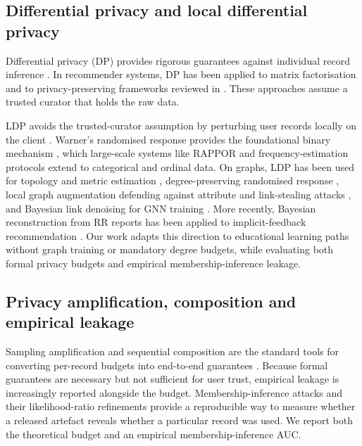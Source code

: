 \documentclass[pdflatex,sn-basic,Numbered]{sn-jnl}
\theoremstyle{plain}
\theoremstyle{remark}
\theoremstyle{definition}
\begin{document}
\subsection{Differential privacy and local differential privacy}

Differential privacy (DP) provides rigorous guarantees against individual record inference \cite{dwork2006calibrating,dwork2014algorithmic}. In recommender systems, DP has been applied to matrix factorisation \cite{mcsherry2009dp,ran2022dpnmf} and to privacy-preserving frameworks reviewed in \cite{himeur2022review}. These approaches assume a trusted curator that holds the raw data.

LDP avoids the trusted-curator assumption by perturbing user records locally on the client \cite{duchi2013local,kairouz2016discrete,kasiviswanathan2011private}. Warner's randomised response provides the foundational binary mechanism \cite{warner1965rr}, which large-scale systems like RAPPOR \cite{erlingsson2014rappor} and frequency-estimation protocols \cite{bassily2015local,cormode2018frequency,wang2017ldp} extend to categorical and ordinal data. On graphs, LDP has been used for topology and metric estimation \cite{ye2022lfgdpr}, degree-preserving randomised response \cite{hidano2024degree}, local graph augmentation defending against attribute and link-stealing attacks \cite{pei2024privacy}, and Bayesian link denoising for GNN training \cite{zhu2023blink}. More recently, Bayesian reconstruction from RR reports has been applied to implicit-feedback recommendation \cite{tang2025bayesian}. Our work adapts this direction to educational learning paths without graph training or mandatory degree budgets, while evaluating both formal privacy budgets and empirical membership-inference leakage.

\subsection{Privacy amplification, composition and empirical leakage}

Sampling amplification and sequential composition are the standard tools for converting per-record budgets into end-to-end guarantees \cite{kasiviswanathan2011private,dwork2014algorithmic,balle2018amplification}. Because formal guarantees are necessary but not sufficient for user trust, empirical leakage is increasingly reported alongside the budget. Membership-inference attacks \cite{shokri2017mia} and their likelihood-ratio refinements \cite{carlini2022mia} provide a reproducible way to measure whether a released artefact reveals whether a particular record was used. We report both the theoretical budget and an empirical membership-inference AUC.
\end{document}
